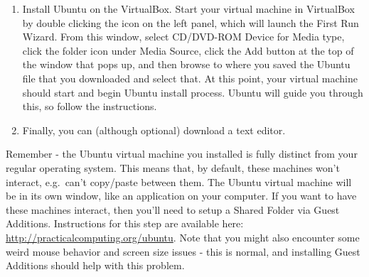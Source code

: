 \documentclass{article}
\begin{document}
\begin{enumerate}
	\item Install Ubuntu on the VirtualBox. Start your virtual machine in VirtualBox by double clicking the icon on the left panel, which will launch the First Run Wizard. From this window, select CD/DVD-ROM Device for Media type, click the folder icon under Media Source, click the Add button at the top of the window that pops up, and then browse to where you saved the Ubuntu file that you downloaded and select that. At this point, your virtual machine should start and begin Ubuntu install process. Ubuntu will guide you through this, so follow the instructions.
	
	\item Finally, you can (although optional) download a text editor.
		
	
\end{enumerate}

Remember - the Ubuntu virtual machine you installed is fully distinct from your regular operating system. This means that, by default, these machines won't interact, e.g.\ can't copy/paste between them. The Ubuntu virtual machine will be in its own window, like an application on your computer. If you want to have these machines interact, then you'll need to setup a Shared Folder via Guest Additions. Instructions for this step are available here: \\ \href{http://practicalcomputing.org/ubuntu}{http://practicalcomputing.org/ubuntu}. Note that you might also encounter some weird mouse behavior and screen size issues - this is normal, and installing Guest Additions should help with this problem.
\end{document}
